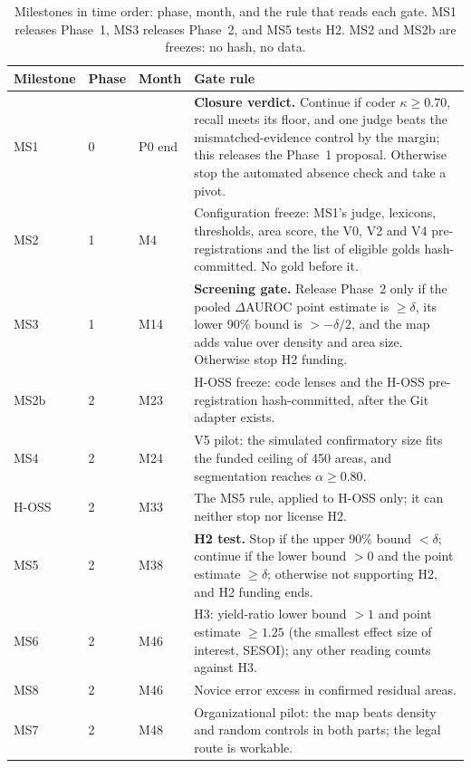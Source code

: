 \begin{table}[!htbp]
  \centering
  \small
  \caption{Milestones in time order: phase, month, and the rule that reads each gate. MS1
  releases Phase~1, MS3 releases Phase~2, and MS5 tests H2. MS2 and MS2b are freezes: no hash,
  no data.}
  \label{tab:milestones}
  \begin{tabularx}{\linewidth}{@{}lllX@{}}
    \toprule
    Milestone & Phase & Month & Gate rule \\
    \midrule
    MS1 & 0 & P0 end & \textbf{Closure verdict.} Continue if coder $\kappa\geq0.70$, recall meets
      its floor, and one judge beats the mismatched-evidence control by the margin; this releases the Phase~1
      proposal. Otherwise stop the automated absence check and take a pivot. \\
    MS2 & 1 & M4 & Configuration freeze: MS1's judge, lexicons, thresholds, area score, the V0,
      V2 and V4 pre-registrations and the list of eligible golds hash-committed. No gold before
      it. \\
    MS3 & 1 & M14 & \textbf{Screening gate.} Release Phase~2 only if the pooled $\Delta$AUROC point
      estimate is $\geq\delta$, its lower 90\% bound is $>-\delta/2$, and the map adds value over
      density and area size. Otherwise stop H2 funding. \\
    MS2b & 2 & M23 & H-OSS freeze: code lenses and the H-OSS pre-registration hash-committed, after
      the Git adapter exists. \\
    MS4 & 2 & M24 & V5 pilot: the simulated confirmatory size fits the funded ceiling of 450
      areas, and segmentation reaches $\alpha\geq0.80$. \\
    H-OSS & 2 & M33 & The MS5 rule, applied to H-OSS only; it can neither stop nor license H2. \\
    MS5 & 2 & M38 & \textbf{H2 test.} Stop if the upper 90\% bound $<\delta$; continue if the
      lower bound $>0$ and the point estimate $\geq\delta$; otherwise not supporting H2, and H2
      funding ends. \\
    MS6 & 2 & M46 & H3: yield-ratio lower bound $>1$ and point estimate $\geq1.25$ (the smallest
      effect size of interest, SESOI); any other reading counts against H3. \\
    MS8 & 2 & M46 & Novice error excess in confirmed residual areas. \\
    MS7 & 2 & M48 & Organizational pilot: the map beats density and random controls in both parts;
      the legal route is workable. \\
    \bottomrule
  \end{tabularx}
\end{table}
\FloatBarrier
